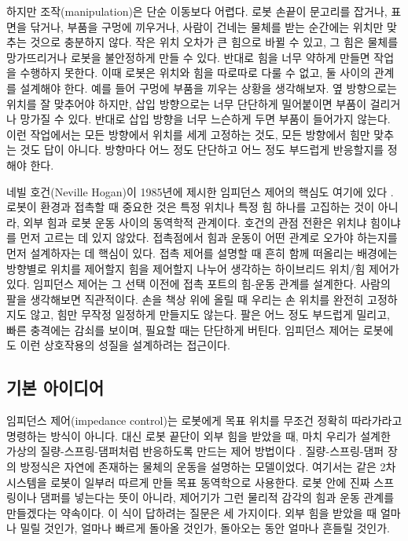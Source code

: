 하지만 조작(manipulation)은 단순 이동보다 어렵다.
로봇 손끝이 문고리를 잡거나, 표면을 닦거나, 부품을 구멍에 끼우거나, 사람이 건네는 물체를 받는 순간에는 위치만 맞추는 것으로 충분하지 않다.
작은 위치 오차가 큰 힘으로 바뀔 수 있고, 그 힘은 물체를 망가뜨리거나 로봇을 불안정하게 만들 수 있다.
반대로 힘을 너무 약하게 만들면 작업을 수행하지 못한다.
이때 로봇은 위치와 힘을 따로따로 다룰 수 없고, 둘 사이의 관계를 설계해야 한다.
예를 들어 구멍에 부품을 끼우는 상황을 생각해보자.
옆 방향으로는 위치를 잘 맞추어야 하지만, 삽입 방향으로는 너무 단단하게 밀어붙이면 부품이 걸리거나 망가질 수 있다.
반대로 삽입 방향을 너무 느슨하게 두면 부품이 들어가지 않는다.
이런 작업에서는 모든 방향에서 위치를 세게 고정하는 것도, 모든 방향에서 힘만 맞추는 것도 답이 아니다.
방향마다 어느 정도 단단하고 어느 정도 부드럽게 반응할지를 정해야 한다.

네빌 호건(Neville Hogan)이 1985년에 제시한 임피던스 제어의 핵심도 여기에 있다 \cite{hogan1985impedancepart1}.
로봇이 환경과 접촉할 때 중요한 것은 특정 위치나 특정 힘 하나를 고집하는 것이 아니라, 외부 힘과 로봇 운동 사이의 동역학적 관계이다.
호건의 관점 전환은 위치냐 힘이냐를 먼저 고르는 데 있지 않았다.
접촉점에서 힘과 운동이 어떤 관계로 오가야 하는지를 먼저 설계하자는 데 핵심이 있다.
접촉 제어를 설명할 때 흔히 함께 떠올리는 배경에는 방향별로 위치를 제어할지 힘을 제어할지 나누어 생각하는 하이브리드 위치/힘 제어가 있다.
임피던스 제어는 그 선택 이전에 접촉 포트의 힘-운동 관계를 설계한다.
사람의 팔을 생각해보면 직관적이다.
손을 책상 위에 올릴 때 우리는 손 위치를 완전히 고정하지도 않고, 힘만 무작정 일정하게 만들지도 않는다.
팔은 어느 정도 부드럽게 밀리고, 빠른 충격에는 감쇠를 보이며, 필요할 때는 단단하게 버틴다.
임피던스 제어는 로봇에도 이런 상호작용의 성질을 설계하려는 접근이다.

\subsection{기본 아이디어}

임피던스 제어(impedance control)는 로봇에게 목표 위치를 무조건 정확히 따라가라고 명령하는 방식이 아니다.
대신 로봇 끝단이 외부 힘을 받았을 때, 마치 우리가 설계한 가상의 질량-스프링-댐퍼처럼 반응하도록 만드는 제어 방법이다 \cite{hogan1985impedancepart1}.
질량-스프링-댐퍼 장의 방정식은 자연에 존재하는 물체의 운동을 설명하는 모델이었다.
여기서는 같은 2차 시스템을 로봇이 일부러 따르게 만들 목표 동역학으로 사용한다.
로봇 안에 진짜 스프링이나 댐퍼를 넣는다는 뜻이 아니라, 제어기가 그런 물리적 감각의 힘과 운동 관계를 만들겠다는 약속이다.
이 식이 답하려는 질문은 세 가지이다.
외부 힘을 받았을 때 얼마나 밀릴 것인가, 얼마나 빠르게 돌아올 것인가, 돌아오는 동안 얼마나 흔들릴 것인가.

